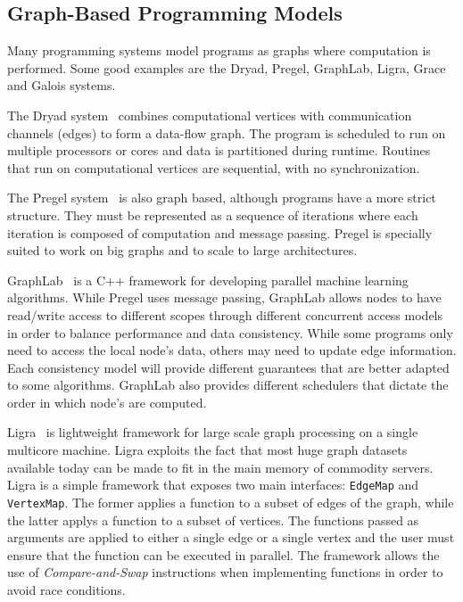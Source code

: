 \subsection{Graph-Based Programming Models}

Many programming systems model programs as graphs where computation is
performed.  Some good examples are the Dryad, Pregel, GraphLab, Ligra, Grace and
Galois systems.

The Dryad system~\cite{Isard:2007:DDD:1272996.1273005} combines computational
vertices with communication channels (edges) to form a data-flow graph. The
program is scheduled to run on multiple processors or cores and data is
partitioned during runtime. Routines that run on computational vertices are
sequential, with no synchronization.

The Pregel system~\cite{Malewicz:2010:PSL:1807167.1807184} is also graph based,
although programs have a more strict structure. They must be represented as
a sequence of iterations where each iteration is composed of computation and
message passing.  Pregel is specially suited to work on big graphs and to
scale to large architectures.

GraphLab~\cite{GraphLab2010} is a C++ framework for developing parallel machine
learning algorithms. While Pregel uses message passing, GraphLab allows nodes to
have read/write access to different scopes through different concurrent access
models in order to balance performance and data consistency. While some programs
only need to access the local node's data, others may need to update edge
information. Each consistency model will provide different guarantees that are
better adapted to some algorithms. GraphLab also provides different schedulers
that dictate the order in which node's are computed.

Ligra~\cite{Shun:2013:LLG:2517327.2442530} is lightweight framework for large scale
graph processing on a single multicore machine. Ligra exploits the fact that
most huge graph datasets available today can be made to fit in the main memory
of commodity servers. Ligra is a simple framework that exposes 
two main interfaces: \texttt{EdgeMap} and \texttt{VertexMap}. The former applies
a function to a subset of edges of the graph, while the latter applys a function
to a subset of vertices. The functions passed as arguments are applied to either
a single edge or a single vertex and the user must ensure that the function can
be executed in parallel. The framework allows the use of \emph{Compare-and-Swap}
instructions when implementing functions in order to avoid race conditions.

